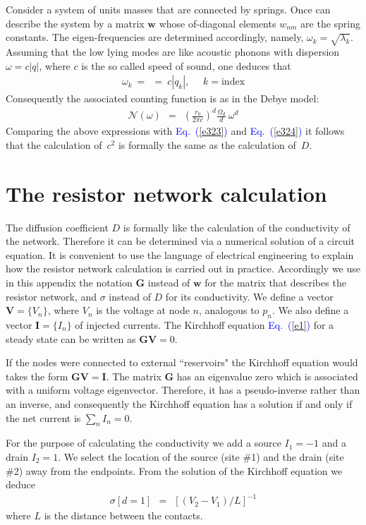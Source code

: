 \documentclass[aps,pre,floats,floatfix,twocolumn]{revtex4}
\newcommand{\beq}{\begin{eqnarray}}
\newcommand{\eeq}{\end{eqnarray}}
\newcommand{\Eq}[1]{\textcolor{blue}{Eq.\!\!~(\ref{#1})}}
\begin{document}
Consider a system of units masses that are connected by springs.
Once can describe the system by a matrix $\bm{w}$ whose 
of-diagonal elements $w_{nm}$ are the spring constants.
The eigen-frequencies are determined accordingly, namely, ${\omega_k = \sqrt{\lambda_k}}$.
%
Assuming that the low lying modes are like 
acoustic phonons with dispersion ${\omega = c |q|}$,
where $c$ is the so called speed of sound,  
one deduces that 
%
\beq
\omega_k \ = \ \ = \ c |q_k|, 
\ \ \ \ \ \  k=\text{index}
\eeq 
%
Consequently the associated counting function is as in the Debye model:
%
\beq 
\mathcal{N}(\omega) \ \ = \ \ 
\left(\frac{r_0}{2\pi c}\right)^d
\frac{\Omega_d}{d}
\ \omega^{d}
\eeq
% 
Comparing the above expressions with \Eq{e323} and \Eq{e324} 
it follows that the calculation of~$c^2$ 
is formally the same as the calculation of~$D$.  



\section{The resistor network calculation}
\label{res}


The diffusion coefficient $D$ is formally like the calculation 
of the conductivity of the network. Therefore it can be determined 
via a numerical solution of a circuit equation.   
%
It is convenient to use the language of electrical engineering 
to explain how the resistor network calculation 
is carried out in practice. 
%
Accordingly we use in this appendix the notation $\bm{G}$ 
instead of $\bm{w}$ for the matrix that describes the 
resistor network, and $\sigma$ instead of $D$ for its conductivity. 
We define a vector $\bm{V}=\{V_n\}$, where $V_n$ is the voltage 
at node $n$, analogous to $p_n$. We also define a vector $\bm{I}=\{I_n\}$ 
of injected currents. The Kirchhoff equation \Eq{e1} for a steady 
state can be written as $\bm{G} \bm{V}=0$. 


If the nodes were connected to external ``reservoirs" 
the Kirchhoff equation would takes the form $\bm{G} \bm{V}=\bm{I}$. 
The matrix $\bm{G}$ has an eigenvalue zero which is associated  
with a uniform voltage eigenvector. Therefore, it has 
a pseudo-inverse rather than an inverse, and consequently 
the Kirchhoff equation has a solution if and only 
if the net current is ${\sum_n I_n=0}$.      


For the purpose of calculating the conductivity
we add a source ${I_1=-1}$ and a drain ${I_2=1}$.
We select the location of the source (site \#1) 
and the drain (site \#2) away from the endpoints. 
From the solution of the Kirchhoff equation we deduce 
%
\beq
\sigma [d{=}1] \ \ = \ \ \left[(V_2-V_1)/L\right]^{-1} 
\eeq
%
where $L$ is the distance between the contacts.   
\end{document}

